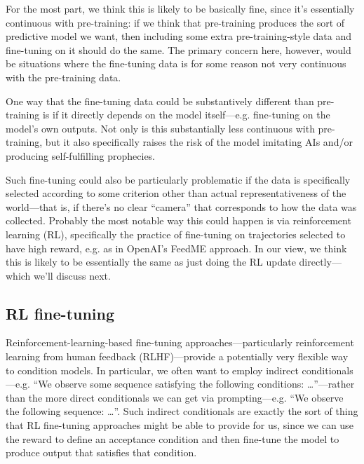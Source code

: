 {For the most part, we think this is likely to be basically fine, since it's essentially continuous with pre-training: if we think that pre-training produces the sort of predictive model we want, then including some extra pre-training-style data and fine-tuning on it should do the same. The primary concern here, however, would be situations where the fine-tuning data is for some reason not very continuous with the pre-training data.

One way that the fine-tuning data could be substantively different than pre-training is if it directly depends on the model itself---e.g. fine-tuning on the model's own outputs. Not only is this substantially less continuous with pre-training, but it also specifically raises the risk of the model imitating AIs and/or producing self-fulfilling prophecies.

Such fine-tuning could also be particularly problematic if the data is specifically selected according to some criterion other than actual representativeness of the world---that is, if there's no clear ``camera'' that corresponds to how the data was collected. Probably the most notable way this could happen is via reinforcement learning (RL), specifically the practice of fine-tuning on trajectories selected to have high reward, e.g. as in OpenAI's FeedME approach\cite{TODO: cite https://beta.openai.com/docs/model-index-for-researchers}. In our view, we think this is likely to be essentially the same as just doing the RL update directly---which we'll discuss next.


\subsection{RL fine-tuning}

Reinforcement-learning-based fine-tuning approaches---particularly reinforcement learning from human feedback (RLHF)---provide a potentially very flexible way to condition models\cite{TODO: cite https://www.alignmentforum.org/posts/chevXfQmRYrTZnj8r/conditioning-prompts-and-fine-tuning}. In particular, we often want to employ indirect conditionals---e.g. ``We observe some sequence satisfying the following conditions: …''---rather than the more direct conditionals we can get via prompting---e.g. ``We observe the following sequence: …''. Such indirect conditionals are exactly the sort of thing that RL fine-tuning approaches might be able to provide for us, since we can use the reward to define an acceptance condition and then fine-tune the model to produce output that satisfies that condition.

}
